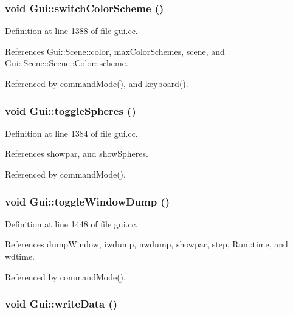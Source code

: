 \hypertarget{namespaceGui_ab3a8248d4ef4514f77fd2a50d70728a}{
\subsubsection[{switchColorScheme}]{\setlength{\rightskip}{0pt plus 5cm}void Gui::switchColorScheme ()}}
\label{namespaceGui_ab3a8248d4ef4514f77fd2a50d70728a}




Definition at line 1388 of file gui.cc.

References Gui::Scene::color, maxColorSchemes, scene, and Gui::Scene::Scene::Color::scheme.

Referenced by commandMode(), and keyboard().\hypertarget{namespaceGui_565addf34ff426cb969e2c56ed140d39}{
\subsubsection[{toggleSpheres}]{\setlength{\rightskip}{0pt plus 5cm}void Gui::toggleSpheres ()}}
\label{namespaceGui_565addf34ff426cb969e2c56ed140d39}




Definition at line 1384 of file gui.cc.

References showpar, and showSpheres.

Referenced by commandMode().\hypertarget{namespaceGui_f65e92132f04c4a318e60fd3b4e7fa38}{
\subsubsection[{toggleWindowDump}]{\setlength{\rightskip}{0pt plus 5cm}void Gui::toggleWindowDump ()}}
\label{namespaceGui_f65e92132f04c4a318e60fd3b4e7fa38}




Definition at line 1448 of file gui.cc.

References dumpWindow, iwdump, nwdump, showpar, step, Run::time, and wdtime.

Referenced by commandMode().\hypertarget{namespaceGui_84221f62186ae4133398e1b6a2475d09}{
\subsubsection[{writeData}]{\setlength{\rightskip}{0pt plus 5cm}void Gui::writeData ()}}
\label{namespaceGui_84221f62186ae4133398e1b6a2475d09}





